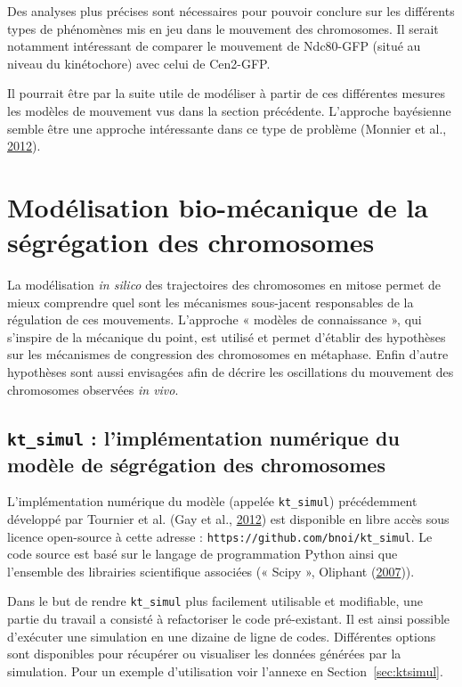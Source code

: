 \documentclass[12pt,a4paper,twoside,openright]{book}
\begin{document}
Des analyses plus précises sont nécessaires pour pouvoir conclure sur
les différents types de phénomènes mis en jeu dans le mouvement des
chromosomes. Il serait notamment intéressant de comparer le mouvement de
Ndc80-GFP (situé au niveau du kinétochore) avec celui de Cen2-GFP.

Il pourrait être par la suite utile de modéliser à partir de ces
différentes mesures les modèles de mouvement vus dans la section
précédente. L'approche bayésienne semble être une approche intéressante
dans ce type de problème (Monnier et al.,
\hyperref[ref-Monnier2012]{2012}).

\section{Modélisation bio-mécanique de la ségrégation des
chromosomes}\label{moduxe9lisation-bio-muxe9canique-de-la-suxe9gruxe9gation-des-chromosomes}

La modélisation \emph{in silico} des trajectoires des chromosomes en
mitose permet de mieux comprendre quel sont les mécanismes sous-jacent
responsables de la régulation de ces mouvements. L'approche « modèles de
connaissance », qui s'inspire de la mécanique du point, est utilisé et
permet d'établir des hypothèses sur les mécanismes de congression des
chromosomes en métaphase. Enfin d'autre hypothèses sont aussi envisagées
afin de décrire les oscillations du mouvement des chromosomes observées
\emph{in vivo}.

\subsection{\texorpdfstring{\texttt{kt\_simul} : l'implémentation
numérique du modèle de ségrégation des
chromosomes}{kt\_simul : l'implémentation numérique du modèle de ségrégation des chromosomes}}\label{ktux5fsimul-limpluxe9mentation-numuxe9rique-du-moduxe8le-de-suxe9gruxe9gation-des-chromosomes}

L'implémentation numérique du modèle (appelée \texttt{kt\_simul})
précédemment développé par Tournier et al. (Gay et al.,
\hyperref[ref-Gay2012a]{2012}) est disponible en libre accès sous
licence open-source à cette adresse :
\texttt{https://github.com/bnoi/kt\_simul}. Le code source est basé sur
le langage de programmation Python ainsi que l'ensemble des librairies
scientifique associées (« Scipy », Oliphant
(\hyperref[ref-Oliphant2007]{2007})).

Dans le but de rendre \texttt{kt\_simul} plus facilement utilisable et
modifiable, une partie du travail a consisté à refactoriser le code
pré-existant. Il est ainsi possible d'exécuter une simulation en une
dizaine de ligne de codes. Différentes options sont disponibles pour
récupérer ou visualiser les données générées par la simulation. Pour un
exemple d'utilisation voir l'annexe en Section~\ref{sec:ktsimul}.
\end{document}
